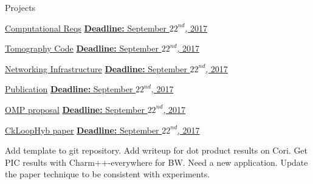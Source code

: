 \begin{columns}  %

\begin{column}{0.10\linewidth}

\begin{block}{Projects}






\underline{Computational Reqs} 
\underline{\textbf{Deadline:} September $22^{nd}$, 2017} 
\begin{enumerate}
\pitem 
\pitem 
\end{enumerate}

\underline{Tomography Code} 
\underline{\textbf{Deadline:} September $22^{nd}$, 2017} 
\begin{enumerate}
\pitem 
\pitem 
\end{enumerate}

\underline{Networking Infrastructure} 
\underline{\textbf{Deadline:} September $22^{nd}$, 2017} 
\begin{enumerate}
\pitem 
\pitem 
\end{enumerate}

\underline{Publication} 
\underline{\textbf{Deadline:} September $22^{nd}$, 2017} 
\begin{enumerate}
\pitem 
\pitem 
\end{enumerate}


\underline{OMP proposal} 
\underline{\textbf{Deadline:} September $22^{nd}$, 2017} 
\begin{enumerate}
\pitem 
\pitem 
\end{enumerate} 

\underline{CkLoopHyb paper}
\underline{\textbf{Deadline:} September $22^{nd}$, 2017}
\begin{enumerate}
\pitem Add template to git repository.
\pitem Add writeup for dot product results on Cori.
\pitem Get PIC results with Charm++-everywhere for BW.
\pitem Need a new application.
\ptask Update the paper technique to be consistent with experiments.


\end{enumerate}
\end{block}
\end{column}
\end{columns}
